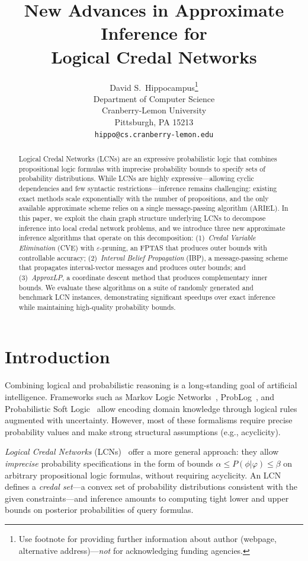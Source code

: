 \documentclass{article}
\title{New Advances in Approximate Inference for\\Logical Credal Networks}
\author{%
  David S.~Hippocampus\thanks{Use footnote for providing further information
    about author (webpage, alternative address)---\emph{not} for acknowledging
    funding agencies.} \\
  Department of Computer Science\\
  Cranberry-Lemon University\\
  Pittsburgh, PA 15213 \\
  \texttt{hippo@cs.cranberry-lemon.edu} \\
}
\begin{document}
\maketitle


\begin{abstract}
Logical Credal Networks (LCNs) are an expressive probabilistic logic that combines propositional logic formulas with imprecise probability bounds to specify sets of probability distributions. While LCNs are highly expressive---allowing cyclic dependencies and few syntactic restrictions---inference remains challenging: existing exact methods scale exponentially with the number of propositions, and the only available approximate scheme relies on a single message-passing algorithm (ARIEL). In this paper, we exploit the chain graph structure underlying LCNs to decompose inference into local credal network problems, and we introduce three new approximate inference algorithms that operate on this decomposition: (1)~\emph{Credal Variable Elimination} (CVE) with $\varepsilon$-pruning, an FPTAS that produces outer bounds with controllable accuracy; (2)~\emph{Interval Belief Propagation} (IBP), a message-passing scheme that propagates interval-vector messages and produces outer bounds; and (3)~\emph{ApproxLP}, a coordinate descent method that produces complementary inner bounds. We evaluate these algorithms on a suite of randomly generated and benchmark LCN instances, demonstrating significant speedups over exact inference while maintaining high-quality probability bounds.
\end{abstract}


\section{Introduction}
\label{sec-intro}

Combining logical and probabilistic reasoning is a long-standing goal of artificial intelligence. Frameworks such as Markov Logic Networks~\cite{richardson2006markov}, ProbLog~\cite{deraedt2007problog}, and Probabilistic Soft Logic~\cite{bach2017hinge} allow encoding domain knowledge through logical rules augmented with uncertainty. However, most of these formalisms require precise probability values and make strong structural assumptions (e.g., acyclicity).

\emph{Logical Credal Networks} (LCNs)~\cite{marinescu2022neurips} offer a more general approach: they allow \emph{imprecise} probability specifications in the form of bounds $\alpha \leq P(\phi|\varphi) \leq \beta$ on arbitrary propositional logic formulas, without requiring acyclicity. An LCN defines a \emph{credal set}---a convex set of probability distributions consistent with the given constraints---and inference amounts to computing tight lower and upper bounds on posterior probabilities of query formulas.
\end{document}
